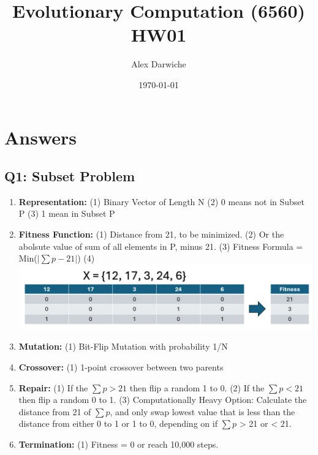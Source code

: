 \documentclass{article}
\title{Evolutionary Computation (6560) HW01}
\author{Alex Darwiche}
\date{\today}
\begin{document}
\maketitle

\section*{Answers}

\subsection*{Q1: Subset Problem}
\begin{enumerate}[label=(\alph*)]
    \item \textbf{Representation:}
    \subitem (1) Binary Vector of Length N
    \subitem (2) 0 means not in Subset P
    \subitem (3) 1 mean in Subset P

    \item \textbf{Fitness Function:}
    \subitem (1) Distance from 21, to be minimized.
    \subitem (2) Or the abolsute value of sum of all elements in P, minus 21.
    \subitem (3) Fitness Formula = Min($|\sum p - 21|$)
    \subitem (4) \includegraphics[width=.75\textwidth]{fitness_problem1.PNG}

    \item \textbf{Mutation:}
    \subitem (1) Bit-Flip Mutation with probability 1/N

    \item \textbf{Crossover:}
    \subitem (1) 1-point crossover between two parents

    \item \textbf{Repair:}
    \subitem (1) If the $\sum p > 21$ then flip a random 1 to 0.
    \subitem (2) If the $\sum p < 21$ then flip a random 0 to 1.
    \subitem (3) Computationally Heavy Option: Calculate the distance from 21 of $\sum p$, and only swap lowest value that is less than the distance from either 0 to 1 or 1 to 0, depending on if $\sum p$ > 21 or < 21.
    

    \item \textbf{Termination:}
    \subitem (1) Fitness = 0 or reach 10,000 steps.
\end{enumerate}
\end{document}
